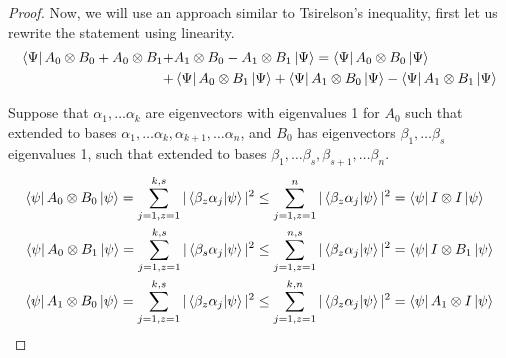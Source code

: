 \begin{proof}
Now, we will use an approach similar to Tsirelson's inequality, first let us rewrite the statement using linearity.
\begin{align}\label{GGG}
\bra{\Psi} A_0\otimes B_0+A_0\otimes B_1+&A_1\otimes B_0-A_1\otimes B_1 \ket{\Psi}= \bra{\Psi}A_0\otimes B_0\ket{\Psi}\\+&\bra{\Psi}A_0\otimes B_1\ket{\Psi}+\bra{\Psi}A_1\otimes B_0\ket{\Psi}-\bra{\Psi}A_1\otimes B_1 \ket{\Psi} 
\end{align}



Suppose that  $\alpha_1,\dots \alpha_k$ are eigenvectors with eigenvalues 1 for $A_0$ such that extended to  bases $\alpha_1,\dots \alpha_k,\alpha_{k+1},\dots \alpha_{n}$,
and   $B_0$ has eigenvectors $\beta_1,\dots \beta_s$  eigenvalues 1, such that extended to  bases $\beta_1,\dots \beta_s,\beta_{s+1},\dots \beta_n$. 
\begin{align}
\bra{\psi}A_0 \otimes B_0\ket{\psi}=\sum_{j=1,z=1}^{k,s}|\bra{\beta_z \alpha_j }\ket{\psi}|^2&\leq
\sum_{j=1,z=1}^{n}|\bra{\beta_z \alpha_j }\ket{\psi}|^2=\bra{\psi}I \otimes I\ket{\psi}\label{QEW1}\\
\bra{\psi}A_0 \otimes B_1\ket{\psi}=\sum_{j=1,z=1}^{k,s}|\bra{\beta_s \alpha_j }\ket{\psi}|^2
&\leq \sum_{j=1,z=1}^{n,s}|\bra{\beta_z \alpha_j }\ket{\psi}|^2=\bra{\psi}I \otimes B_1\ket{\psi}\\
\bra{\psi}A_1 \otimes B_0\ket{\psi}=\sum_{j=1,z=1}^{k,s}|\bra{\beta_z \alpha_j }\ket{\psi}|^2&\leq
\sum_{j=1,z=1}^{k,n}|\bra{\beta_z \alpha_j }\ket{\psi}|^2=\bra{\psi}A_1 \otimes I\ket{\psi}\label{QEW4}
\end{align}


\end{proof}
